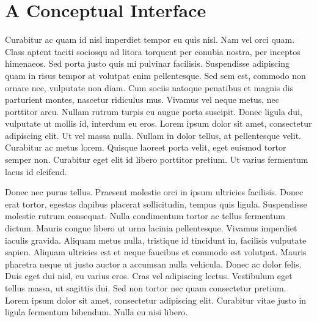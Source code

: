 \chapter{A Conceptual Interface}
Curabitur ac quam id nisl imperdiet tempor eu quis nisl. Nam vel orci quam. Class aptent taciti sociosqu ad litora torquent per conubia nostra, per inceptos himenaeos. Sed porta justo quis mi pulvinar facilisis. Suspendisse adipiscing quam in risus tempor at volutpat enim pellentesque. Sed sem est, commodo non ornare nec, vulputate non diam. Cum sociis natoque penatibus et magnis dis parturient montes, nascetur ridiculus mus. Vivamus vel neque metus, nec porttitor arcu. Nullam rutrum turpis eu augue porta suscipit. Donec ligula dui, vulputate ut mollis id, interdum eu eros. Lorem ipsum dolor sit amet, consectetur adipiscing elit. Ut vel massa nulla. Nullam in dolor tellus, at pellentesque velit. Curabitur ac metus lorem. Quisque laoreet porta velit, eget euismod tortor semper non. Curabitur eget elit id libero porttitor pretium. Ut varius fermentum lacus id eleifend.

Donec nec purus tellus. Praesent molestie orci in ipsum ultricies facilisis. Donec erat tortor, egestas dapibus placerat sollicitudin, tempus quis ligula. Suspendisse molestie rutrum consequat. Nulla condimentum tortor ac tellus fermentum dictum. Mauris congue libero ut urna lacinia pellentesque. Vivamus imperdiet iaculis gravida. Aliquam metus nulla, tristique id tincidunt in, facilisis vulputate sapien. Aliquam ultricies est et neque faucibus et commodo est volutpat. Mauris pharetra neque ut justo auctor a accumsan nulla vehicula. Donec ac dolor felis. Duis eget dui nisl, eu varius eros. Cras vel adipiscing lectus. Vestibulum eget tellus massa, ut sagittis dui. Sed non tortor nec quam consectetur pretium. Lorem ipsum dolor sit amet, consectetur adipiscing elit. Curabitur vitae justo in ligula fermentum bibendum. Nulla eu nisi libero.